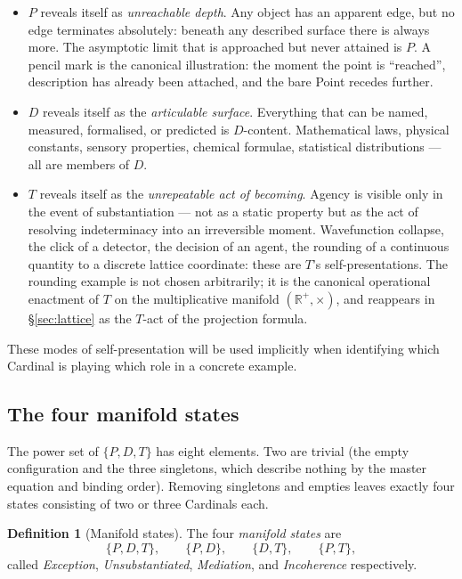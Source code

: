 \documentclass[11pt,a4paper]{article}
\theoremstyle{definition}
\newtheorem{definition}[theorem]{Definition}
\theoremstyle{remark}
\newcommand{\R}{\mathbb{R}}
\begin{document}
\begin{itemize}[leftmargin=*]
\item $P$ reveals itself as \emph{unreachable depth}. Any object has an apparent edge, but no edge terminates absolutely: beneath any described surface there is always more. The asymptotic limit that is approached but never attained is $P$. A pencil mark is the canonical illustration: the moment the point is ``reached'', description has already been attached, and the bare Point recedes further.
\item $D$ reveals itself as the \emph{articulable surface}. Everything that can be named, measured, formalised, or predicted is $D$-content. Mathematical laws, physical constants, sensory properties, chemical formulae, statistical distributions --- all are members of $D$.
\item $T$ reveals itself as the \emph{unrepeatable act of becoming}. Agency is visible only in the event of substantiation --- not as a static property but as the act of resolving indeterminacy into an irreversible moment. Wavefunction collapse, the click of a detector, the decision of an agent, the rounding of a continuous quantity to a discrete lattice coordinate: these are $T$'s self-presentations. The rounding example is not chosen arbitrarily; it is the canonical operational enactment of $T$ on the multiplicative manifold $(\R^{+},\times)$, and reappears in \S\ref{sec:lattice} as the $T$-act of the projection formula.
\end{itemize}

These modes of self-presentation will be used implicitly when identifying which Cardinal is playing which role in a concrete example.

\subsection{The four manifold states}\label{subsec:states}

The power set of $\{P,D,T\}$ has eight elements. Two are trivial (the empty configuration and the three singletons, which describe nothing by the master equation and binding order). Removing singletons and empties leaves exactly four states consisting of two or three Cardinals each.

\begin{definition}[Manifold states]\label{def:states}
The four \emph{manifold states} are
\[
\{P,D,T\},\qquad \{P,D\},\qquad \{D,T\},\qquad \{P,T\},
\]
called \emph{Exception}, \emph{Unsubstantiated}, \emph{Mediation}, and \emph{Incoherence} respectively.
\end{definition}
\end{document}
